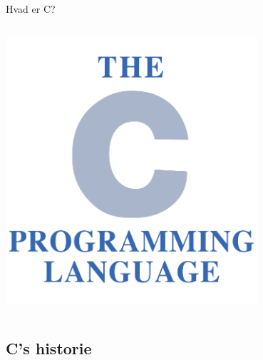 \documentclass{beamer}
\begin{document}
\begin{frame}{Hvad er C?}
\begin{columns}
		\begin{column}{0.5\textwidth}
		\begin{center}
     		\includegraphics[width=0.7\textwidth]{assets/The_C_Programming_Language_logo.png}
     	\end{center}
		\end{column}
		
	\end{columns}
\end{frame}
\subsection{C's historie}
\end{document}
